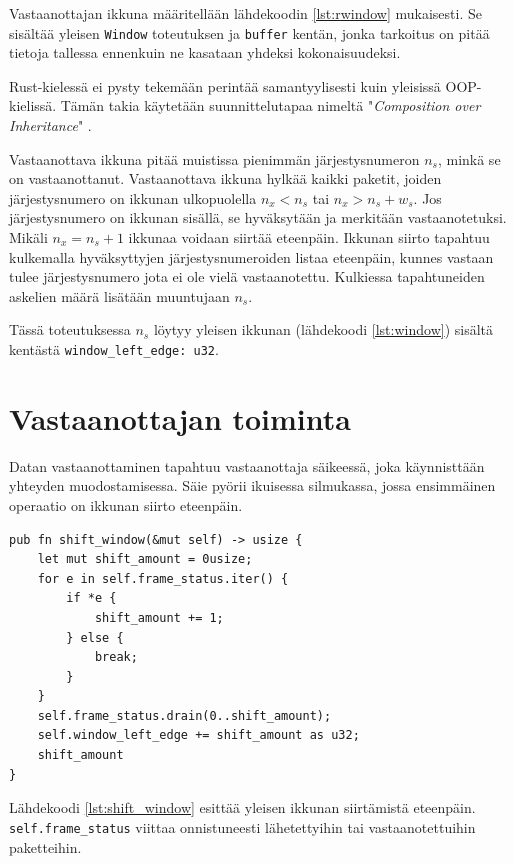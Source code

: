 \documentclass[a4paper,12pt]{article}
\begin{document}
Vastaanottajan ikkuna määritellään lähdekoodin \ref{lst:rwindow} mukaisesti. Se sisältää yleisen \lstinline{Window} toteutuksen ja \lstinline{buffer} kentän, jonka tarkoitus on pitää tietoja 
tallessa ennenkuin ne kasataan yhdeksi kokonaisuudeksi. \par
Rust-kielessä ei pysty tekemään perintää samantyylisesti kuin yleisissä OOP-kielissä. Tämän takia
käytetään suunnittelutapaa nimeltä "\textit{Composition over Inheritance}" \cite{Ivicevic202228Inheritance}.

\begin{framed}
    Vastaanottava ikkuna pitää muistissa pienimmän järjestysnumeron $n_s$, minkä se on vastaanottanut. 
Vastaanottava ikkuna hylkää kaikki paketit, joiden järjestysnumero on ikkunan ulkopuolella $n_x < n_s$ tai $n_x > n_s + w_s$. Jos järjestysnumero on ikkunan sisällä, se hyväksytään ja merkitään vastaanotetuksi. Mikäli $n_x = n_s + 1$ ikkunaa voidaan siirtää eteenpäin.
    Ikkunan siirto tapahtuu kulkemalla hyväksyttyjen järjestysnumeroiden listaa eteenpäin, kunnes vastaan tulee järjestysnumero jota ei ole vielä vastaanotettu. Kulkiessa tapahtuneiden askelien määrä lisätään muuntujaan $n_s$.
\end{framed}

    Tässä toteutuksessa $n_s$ löytyy yleisen ikkunan (lähdekoodi \ref{lst:window}) sisältä kentästä \lstinline{window_left_edge: u32}.
    

    \section{Vastaanottajan toiminta}
    Datan vastaanottaminen tapahtuu vastaanottaja säikeessä, joka käynnisttään yhteyden muodostamisessa.
    Säie pyörii ikuisessa silmukassa, jossa ensimmäinen operaatio on ikkunan siirto eteenpäin.

\begin{lstlisting}[caption={Ikkunan siirto}, label={lst:shift_window}]
pub fn shift_window(&mut self) -> usize {
    let mut shift_amount = 0usize;
    for e in self.frame_status.iter() {
        if *e {
            shift_amount += 1;
        } else {
            break;
        }
    }
    self.frame_status.drain(0..shift_amount);
    self.window_left_edge += shift_amount as u32;
    shift_amount
}
\end{lstlisting}      

Lähdekoodi \ref{lst:shift_window} esittää yleisen ikkunan siirtämistä eteenpäin.
\lstinline{self.frame_status} viittaa onnistuneesti lähetettyihin tai vastaanotettuihin paketteihin.
\end{document}
